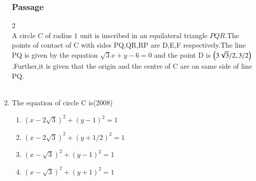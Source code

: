 \documentclass[journal,12pt,twocolumn]{IEEEtran}
\theoremstyle{remark}
\begin{document}
\begin{enumerate}
\subsubsection{Passage } 2\\
A circle $C$ of radius $1$ unit is inscribed in an equilateral triangle $PQR$.The points of contact of C with sides PQ,QR,RP are D,E,F respectively.The line PQ is given by the equation $\sqrt{3}x+y-6=0$ and the point D is $\left(3\sqrt{3}/2 , 3/2\right)$.Further,it is given that the origin and the centre of C are on same side of line PQ.\\
\\
\item The equation of circle C is\hfill(2008)
\begin{enumerate}
\item $(x-2\sqrt{3})^2 + (y-1)^2=1$\\
\item $(x-2\sqrt{3})^2 + (y+1/2)^2=1$\\
\item $(x-\sqrt{3})^2 + (y-1)^2=1$\\
\item $(x-\sqrt{3})^2 + (y+1)^2=1$\\
\end{enumerate}
\end{enumerate}
\end{document}
